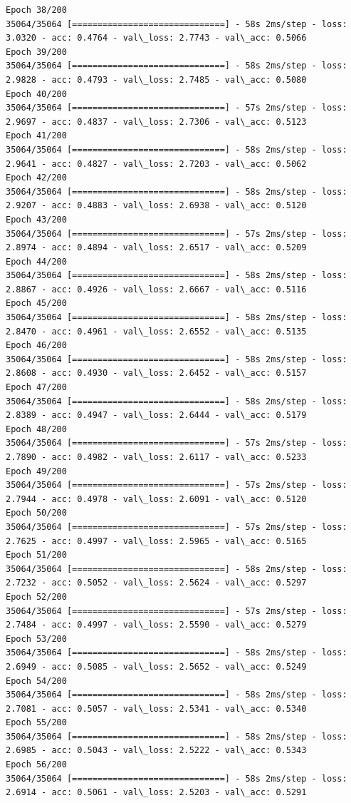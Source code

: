 \documentclass[11pt]{article}
\begin{document}
\begin{Verbatim}[commandchars=\\\{\}]
Epoch 38/200
35064/35064 [==============================] - 58s 2ms/step - loss: 3.0320 - acc: 0.4764 - val\_loss: 2.7743 - val\_acc: 0.5066
Epoch 39/200
35064/35064 [==============================] - 58s 2ms/step - loss: 2.9828 - acc: 0.4793 - val\_loss: 2.7485 - val\_acc: 0.5080
Epoch 40/200
35064/35064 [==============================] - 57s 2ms/step - loss: 2.9697 - acc: 0.4837 - val\_loss: 2.7306 - val\_acc: 0.5123
Epoch 41/200
35064/35064 [==============================] - 58s 2ms/step - loss: 2.9641 - acc: 0.4827 - val\_loss: 2.7203 - val\_acc: 0.5062
Epoch 42/200
35064/35064 [==============================] - 58s 2ms/step - loss: 2.9207 - acc: 0.4883 - val\_loss: 2.6938 - val\_acc: 0.5120
Epoch 43/200
35064/35064 [==============================] - 57s 2ms/step - loss: 2.8974 - acc: 0.4894 - val\_loss: 2.6517 - val\_acc: 0.5209
Epoch 44/200
35064/35064 [==============================] - 58s 2ms/step - loss: 2.8867 - acc: 0.4926 - val\_loss: 2.6667 - val\_acc: 0.5116
Epoch 45/200
35064/35064 [==============================] - 58s 2ms/step - loss: 2.8470 - acc: 0.4961 - val\_loss: 2.6552 - val\_acc: 0.5135
Epoch 46/200
35064/35064 [==============================] - 58s 2ms/step - loss: 2.8608 - acc: 0.4930 - val\_loss: 2.6452 - val\_acc: 0.5157
Epoch 47/200
35064/35064 [==============================] - 58s 2ms/step - loss: 2.8389 - acc: 0.4947 - val\_loss: 2.6444 - val\_acc: 0.5179
Epoch 48/200
35064/35064 [==============================] - 57s 2ms/step - loss: 2.7890 - acc: 0.4982 - val\_loss: 2.6117 - val\_acc: 0.5233
Epoch 49/200
35064/35064 [==============================] - 57s 2ms/step - loss: 2.7944 - acc: 0.4978 - val\_loss: 2.6091 - val\_acc: 0.5120
Epoch 50/200
35064/35064 [==============================] - 57s 2ms/step - loss: 2.7625 - acc: 0.4997 - val\_loss: 2.5965 - val\_acc: 0.5165
Epoch 51/200
35064/35064 [==============================] - 58s 2ms/step - loss: 2.7232 - acc: 0.5052 - val\_loss: 2.5624 - val\_acc: 0.5297
Epoch 52/200
35064/35064 [==============================] - 57s 2ms/step - loss: 2.7484 - acc: 0.4997 - val\_loss: 2.5590 - val\_acc: 0.5279
Epoch 53/200
35064/35064 [==============================] - 58s 2ms/step - loss: 2.6949 - acc: 0.5085 - val\_loss: 2.5652 - val\_acc: 0.5249
Epoch 54/200
35064/35064 [==============================] - 58s 2ms/step - loss: 2.7081 - acc: 0.5057 - val\_loss: 2.5341 - val\_acc: 0.5340
Epoch 55/200
35064/35064 [==============================] - 58s 2ms/step - loss: 2.6985 - acc: 0.5043 - val\_loss: 2.5222 - val\_acc: 0.5343
Epoch 56/200
35064/35064 [==============================] - 58s 2ms/step - loss: 2.6914 - acc: 0.5061 - val\_loss: 2.5203 - val\_acc: 0.5291

\end{Verbatim}
\end{document}
